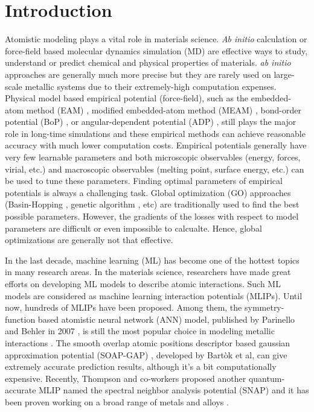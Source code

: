 \documentclass[final,3p,times]{elsarticle}
\begin{document}
\section{Introduction}
\label{sec:introduction}

Atomistic modeling plays a vital role in materials science. \textit{Ab initio} 
calculation or force-field based molecular dynamics simulation (MD) are 
effective ways to study, understand or predict chemical and physical properties 
of materials. \textit{ab initio} approaches are generally much more precise but 
they are rarely used on large-scale metallic systems due to their extremely-high 
computation expenses. Physical model based empirical potential (force-field), 
such as the embedded-atom method (EAM) \cite{EAM0,EAM1,EAM2,EAM3,EAM4}, 
modified embedded-atom method (MEAM) \cite{MEAM0,MEAM1,MEAM2,MEAM_Jelinek}, 
bond-order potential (BoP) \cite{BOP0,BOP1,BOP2,BOP3}, or angular-dependent 
potential (ADP) \cite{ADP0,ADP1,ADP2,ADP3,ADP_FeNi}, still plays the major role 
in long-time simulations and these empirical methods can achieve reasonable 
accuracy with much lower computation costs. Empirical potentials 
generally have very few learnable parameters and both microscopic observables 
(energy, forces, virial, etc.) and macroscopic observables (melting 
point, surface energy, etc.) can be used to tune these parameters. Finding 
optimal parameters of empirical potentials is always a challenging task. Global 
optimization (GO) approaches (Basin-Hopping \cite{BH0,BH1}, genetic algorithm 
\cite{PCIPY,PGA}, etc) are traditionally used to find the best possible 
parameters. However, the gradients of the losses with respect to model 
parameters are difficult or even impossible to calcualte. Hence, 
global optimizations are generally not that effective.

In the last decade, machine learning (ML) has become one of the hottest 
topics in many research areas. In the materials science, researchers have made 
great efforts on developing ML models to describe atomic interactions. Such ML 
models are considered as machine learning interaction potentials (MLIPs). Until 
now, hundreds of MLIPs have been proposed. Among them, the symmetry-function 
based atomistic neural network (ANN) model, published by Parinello and Behler in 
2007 \cite{SF2007,SF1,SF2,SF3,SF4}, is still the most popular choice in modeling 
metallic interactions \cite{SFApp0,SFApp1,SFApp2}. 
The smooth overlap atomic positions descriptor based gaussian approximation 
potential (SOAP-GAP) \cite{soap0,soap1,soap2,soap3}, developed by Bartòk et al, 
can give extremely accurate prediction results, although it's a bit 
computationally expensive. 
Recently, Thompson and co-workers proposed another quantum-accurate MLIP named 
the spectral neighbor analysis potential (SNAP) \cite{SNAP_Algo} and it has 
been proven working on a broad range of metals and 
alloys \cite{SNAP_Mo,SNAP,SNAP_New}.
\end{document}
